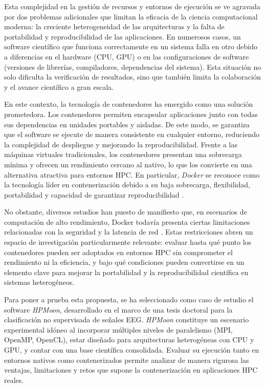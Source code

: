 Esta complejidad en la gestión de recursos y entornos de ejecución se ve agravada por dos problemas adicionales que limitan la eficacia de la ciencia computacional moderna: la creciente heterogeneidad de las arquitecturas y la falta de portabilidad y reproducibilidad de las aplicaciones. En numerosos casos, un software científico que funciona correctamente en un sistema falla en otro debido a diferencias en el hardware (CPU, GPU) o en las configuraciones de software (versiones de librerías, compiladores, dependencias del sistema). Esta situación no solo dificulta la verificación de resultados, sino que también limita la colaboración y el avance científico a gran escala.

En este contexto, la tecnología de contenedores ha emergido como una solución prometedora. Los contenedores permiten encapsular aplicaciones junto con todas sus dependencias en unidades portables y aisladas. De este modo, se garantiza que el software se ejecute de manera consistente en cualquier entorno, reduciendo la complejidad de despliegue y mejorando la reproducibilidad. Frente a las máquinas virtuales tradicionales, los contenedores presentan una sobrecarga mínima y ofrecen un rendimiento cercano al nativo, lo que los convierte en una alternativa atractiva para entornos HPC. En particular, \textit{Docker} se reconoce como la tecnología líder en contenerización debido a su baja sobrecarga, flexibilidad, portabilidad y capacidad de garantizar reproducibilidad \cite{saha2016evaluation}.

No obstante, diversos estudios han puesto de manifiesto que, en escenarios de computación de alto rendimiento, Docker todavía presenta ciertas limitaciones relacionadas con la seguridad y la latencia de red \cite{Alles2018AssessingTC, MedranoJaimes2018UseOC}. Estas restricciones abren un espacio de investigación particularmente relevante: evaluar hasta qué punto los contenedores pueden ser adoptados en entornos HPC sin comprometer el rendimiento ni la eficiencia, y bajo qué condiciones pueden convertirse en un elemento clave para mejorar la portabilidad y la reproducibilidad científica en sistemas heterogéneos.

Para poner a prueba esta propuesta, se ha seleccionado como caso de estudio el software \textit{HPMoon}, desarrollado en el marco de una tesis doctoral para la clasificación no supervisada de señales \ac{EEG}. \textit{HPMoon} constituye un escenario experimental idóneo al incorporar múltiples niveles de paralelismo (MPI, OpenMP, OpenCL), estar diseñado para arquitecturas heterogéneas con CPU y GPU, y contar con una base científica consolidada. Evaluar su ejecución tanto en entornos nativos como contenerizados permite analizar de manera rigurosa las ventajas, limitaciones y retos que supone la contenerización en aplicaciones HPC reales.

